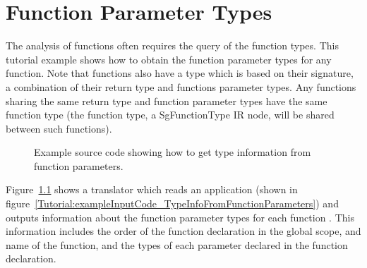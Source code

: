 \chapter{Function Parameter Types}

   The analysis of functions often requires the query of the
function types.  This tutorial example shows how to obtain 
the function parameter types for any function.  Note that functions
also have a type which is based on their signature, a combination
of their return type and functions parameter types.  Any functions 
sharing the same return type and function parameter types have the 
same function type (the function type, a SgFunctionType IR node, 
will be shared between such functions).

\begin{figure}[!h]
{\indent
{\mySmallFontSize


\begin{latexonly}
   
\end{latexonly}

\begin{htmlonly}
   
\end{htmlonly}

}
}
\caption{Example source code showing how to get type information from function parameters.}
\label{Tutorial:exampleTypeInfoFromFunctionParameters}
\end{figure}

   Figure~\ref{Tutorial:exampleTypeInfoFromFunctionParameters} shows a translator which
reads an application (shown in
figure~\ref{Tutorial:exampleInputCode_TypeInfoFromFunctionParameters}) 
and outputs information about the function parameter types for each function
.
This information includes the order of the function declaration in the global
scope, and name of the function, and the types of each parameter declared in 
the function declaration.

